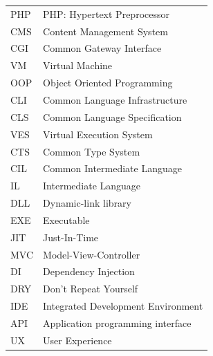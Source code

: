 \begin{tabular}{ l l }
 PHP & PHP: Hypertext Preprocessor \\
 CMS & Content Management System \\
 CGI & Common Gateway Interface \\ 
 VM  & Virtual Machine \\
 OOP & Object Oriented Programming \\
 CLI & Common Language Infrastructure \\ 
 CLS & Common Language Specification \\
 VES & Virtual Execution System \\
 CTS & Common Type System \\
 CIL & Common Intermediate Language \\   
 IL  & Intermediate Language \\
 DLL & Dynamic-link library \\
 EXE & Executable \\ 
 JIT & Just-In-Time \\   
 MVC & Model-View-Controller \\
 DI  & Dependency Injection \\
 DRY & Don't Repeat Yourself \\
 IDE & Integrated Development Environment \\
 API & Application programming interface \\
 UX  & User Experience \\
\end{tabular}